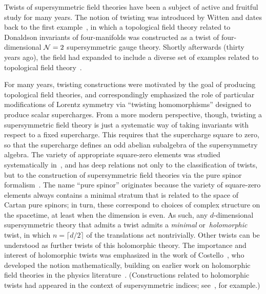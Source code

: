 %
%
%
%
%
%
%

Twists of supersymmetric field theories have been a subject of active and fruitful study for many years. 
The notion of twisting was introduced by Witten and dates back to the first example~\cite{WittenTwist}, in which a topological field theory related to Donaldson invariants of four-manifolds was constructed as a twist of four-dimensional $\mathcal N=2$ supersymmetric gauge theory.
Shortly afterwards (thirty years ago), the field had expanded to include a diverse set of examples related to topological field theory~\cite{BlauThompson}. 

For many years, twisting constructions were motivated by the goal of producing topological field theories, and correspondingly emphasized the role of particular modifications of  Lorentz symmetry via ``twisting homomorphisms'' designed to produce scalar supercharges.
From a more modern perspective, though, twisting a supersymmetric field theory is just a systematic way of taking invariants with respect to a fixed supercharge. This requires that the supercharge square to zero, so that the supercharge defines an odd abelian subalgebra of the supersymmetry algebra.
The variety of appropriate square-zero elements was studied systematically in~\cite{NV}, and has deep relations not only to the  classification of  twists, but to the construction  of supersymmetric field theories via the pure spinor formalism~\cite{Cederwall,EHSW}. The name ``pure spinor'' originates because the  variety of  square-zero elements always contains a minimal stratum that is related to the space of Cartan pure spinors; in turn, these correspond to choices of complex structure on the  spacetime, at least when the dimension is even. 
As such, any $d$-dimensional  supersymmetric theory that admits a twist admits a \emph{minimal} or~\emph{holomorphic} twist, in which $n=\lceil d/2\rceil$ of the translations act nontrivially. Other twists can be understood as further twists of this holomorphic theory.
The importance and interest of holomorphic twists was emphasized in the work of Costello~\cite{CostelloHol}, who developed the notion mathematically, building on earlier work on holomorphic field theories in the physics literature~\cite{NekThesis}. (Constructions related to holomorphic twists had appeared in the context of supersymmetric indices; see~\cite{Romelsberger}, for example.) 

